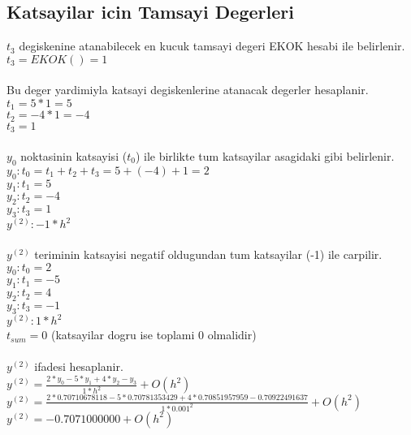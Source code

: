 \documentclass{article}
\begin{document}
\subsection{Katsayilar icin Tamsayi Degerleri}
$t_{3}$ degiskenine atanabilecek en kucuk tamsayi degeri EKOK hesabi ile belirlenir.\\
$t_{3}=EKOK()=1$\\
\\
Bu deger yardimiyla katsayi degiskenlerine atanacak degerler hesaplanir.\\
$\displaystyle t_{1}=5*1=5$\\
$\displaystyle t_{2}=-4*1=-4$\\
$\displaystyle t_{3}=1$\\
\\
$y_{0}$ noktasinin katsayisi ($t_{0}$) ile birlikte tum katsayilar asagidaki gibi belirlenir.\\
$y_{0}: t_{0}=t_{1}+t_{2}+t_{3}=5+(-4)+1=2$\\
$y_{1}: t_{1}=5$\\
$y_{2}: t_{2}=-4$\\
$y_{3}: t_{3}=1$\\
$y^{(2)}: -1*h^2$\\
\\
$y^{(2)}$ teriminin katsayisi negatif oldugundan tum katsayilar (-1) ile carpilir.\\
$y_{0}: t_{0}=2$\\
$y_{1}: t_{1}=-5$\\
$y_{2}: t_{2}=4$\\
$y_{3}: t_{3}=-1$\\
$y^{(2)}: 1*h^{2}$\\
$t_{sum} = 0$ (katsayilar dogru ise toplami 0 olmalidir)\\
\\
$y^{(2)}$ ifadesi hesaplanir.\\
$y^{(2)}=\frac{2*y_{0}-5*y_{1}+4*y_{2}-y_{3}}{1*h^{2}}+O(h^{2})$\\
$y^{(2)}=\frac{2*0.70710678118-5*0.70781353429+4*0.70851957959-0.70922491637}{1*0.001^{2}}+O(h^{2})$\\
$y^{(2)}=-0.7071000000+O(h^{2})$\\
\end{document}
